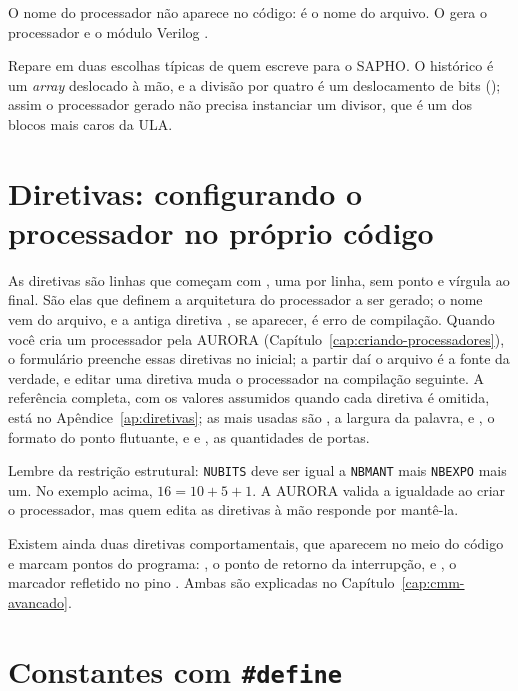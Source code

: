 O nome do processador não aparece no código: é o nome do arquivo. O  gera o processador  e o módulo Verilog .

Repare em duas escolhas típicas de quem escreve para o SAPHO. O histórico é um \textit{array} deslocado à mão, e a divisão por quatro é um deslocamento de bits (); assim o processador gerado não precisa instanciar um divisor, que é um dos blocos mais caros da ULA.

\section{Diretivas: configurando o processador no próprio código}
\label{sec:diretivas}

As diretivas são linhas que começam com \code{\#}, uma por linha, sem ponto e vírgula ao final. São elas que definem a arquitetura do processador a ser gerado; o nome vem do arquivo, e a antiga diretiva , se aparecer, é erro de compilação. Quando você cria um processador pela AURORA (Capítulo~\ref{cap:criando-processadores}), o formulário preenche essas diretivas no  inicial; a partir daí o arquivo é a fonte da verdade, e editar uma diretiva muda o processador na compilação seguinte. A referência completa, com os valores assumidos quando cada diretiva é omitida, está no Apêndice~\ref{ap:diretivas}; as mais usadas são , a largura da palavra,  e , o formato do ponto flutuante, e  e , as quantidades de portas.

\begin{aviso}
Lembre da restrição estrutural: \texttt{NUBITS} deve ser igual a \texttt{NBMANT} mais \texttt{NBEXPO} mais um. No exemplo acima, $16 = 10 + 5 + 1$. A AURORA valida a igualdade ao criar o processador, mas quem edita as diretivas à mão responde por mantê-la.
\end{aviso}

Existem ainda duas diretivas comportamentais, que aparecem no meio do código e marcam pontos do programa: , o ponto de retorno da interrupção, e , o marcador refletido no pino . Ambas são explicadas no Capítulo~\ref{cap:cmm-avancado}.

\section{Constantes com \texttt{\#define}}


